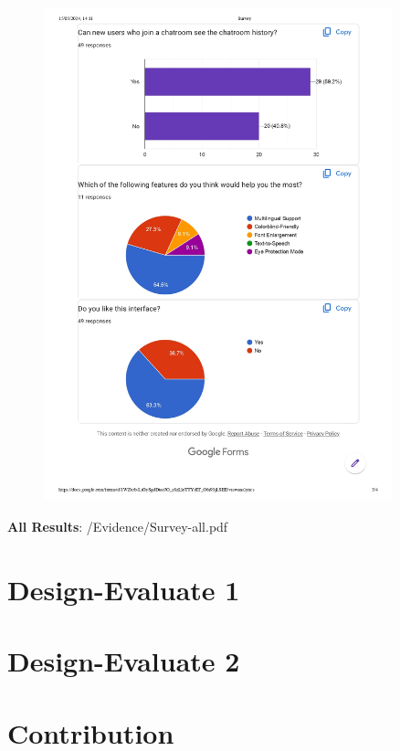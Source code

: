 \documentclass[12pt]{article}
\begin{document}
        \begin{figure}[H]
            \centering
            \includegraphics[width=0.9\textwidth]{graphs/Survey-summary_page-0003.jpg}
        \end{figure}

        \textbf{All Results}: /Evidence/Survey-all.pdf



\section{Design-Evaluate 1}



\section{Design-Evaluate 2}


\section{Contribution}


 
\end{document}
